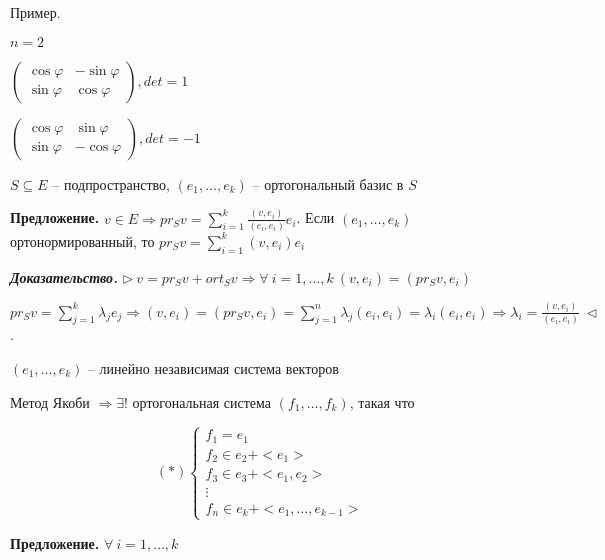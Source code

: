 \vspace{\baselineskip}
Пример.

$n = 2$

$\begin{pmatrix} \cos \varphi & - \sin \varphi \\
\sin \varphi & \cos \varphi \end{pmatrix}, det = 1$

$\begin{pmatrix} \cos \varphi & \sin \varphi \\
\sin \varphi & - \cos \varphi \end{pmatrix}, det = -1$

\vspace{\baselineskip}
$S \subseteq E$ -- подпространство, $(e_1, \dots, e_k)$ -- ортогональный базис в $S$

\vspace{\baselineskip}
\textbf{Предложение.} $v \in E \Rightarrow pr_S v = \sum\limits_{i=1}^k \frac{(v, e_i)}{(e_i, e_i)} e_i$. Если $(e_1, \dots, e_k)$ ортонормированный, то $pr_S v = \sum\limits_{i=1}^k (v, e_i) e_i$

\vspace{\baselineskip}
\textbf{\textit{Доказательство.}} $\rhd \ v = pr_S v + ort_S v \Rightarrow \forall \ i = 1, \dots, k \ (v, e_i) = (pr_S v, e_i)$

$pr_S v = \sum\limits_{j = 1}^k \lambda_j e_j \Rightarrow (v, e_i) = (pr_S v, e_i) = \sum\limits_{j = 1}^n \lambda_j (e_i, e_i) = \lambda_i (e_i, e_i) \Rightarrow \lambda_i = \frac{(v, e_i)}{(e_i, e_i)} \ \lhd$.

\vspace{\baselineskip}
$(e_1, \dots, e_k)$  -- линейно независимая система векторов

Метод Якоби $\Rightarrow \exists!$ ортогональная система $(f_1, \dots, f_k)$, такая что

\begin{equation*}
(*) \begin{cases}
		f_1 = e_1 \\
		f_2 \in e_2 + <e_1> \\
        f_3 \in e_3 + <e_1, e_2> \\
        \vdots \\
        f_n \in e_k + <e_1, \dots, e_{k-1}>
	\end{cases}
\end{equation*}  

\vspace{\baselineskip}
\textbf{Предложение.} $\forall \ i = 1, \dots, k$

